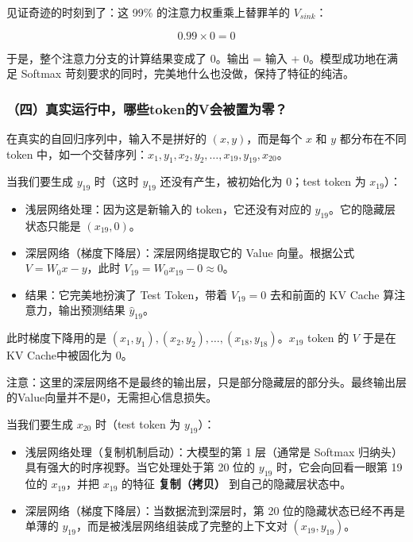 见证奇迹的时刻到了：这 99\% 的注意力权重乘上替罪羊的 \(V_{sink}\)：

\[
0.99 \times 0 = 0
\]

于是，整个注意力分支的计算结果变成了 0。输出 = 输入 + 0。模型成功地在满足 Softmax 苛刻要求的同时，完美地什么也没做，保持了特征的纯洁。

\hypertarget{ux56dbux771fux5b9eux8fd0ux884cux4e2dux54eaux4e9btokenux7684vux4f1aux88abux7f6eux4e3aux96f6}{%
\subsubsection{（四）真实运行中，哪些token的V会被置为零？}\label{ux56dbux771fux5b9eux8fd0ux884cux4e2dux54eaux4e9btokenux7684vux4f1aux88abux7f6eux4e3aux96f6}}

在真实的自回归序列中，输入不是拼好的 \((x,y)\)，而是每个 \(x\) 和 \(y\) 都分布在不同 token 中，如一个交替序列：\(x_1,y_1,x_2,y_2,\ldots,x_{19},y_{19},x_{20}\)。

当我们要生成 \(y_{19}\) 时（这时 \(y_{19}\) 还没有产生，被初始化为 \(0\)；test token 为 \(x_{19}\)）：

\begin{itemize}
\tightlist
\item
  浅层网络处理：因为这是新输入的 token，它还没有对应的 \(y_{19}\)。它的隐藏层状态只能是 \((x_{19},0)\)。
\item
  深层网络（梯度下降层）：深层网络提取它的 Value 向量。根据公式 \(V = W_0x - y\)，此时 \(V_{19}=W_0x_{19}-0 \approx 0\)。
\item
  结果：它完美地扮演了 Test Token，带着 \(V_{19}=0\) 去和前面的 KV Cache 算注意力，输出预测结果 \(\hat{y}_{19}\)。
\end{itemize}

此时梯度下降用的是 \((x_1,y_1),(x_2,y_2),\ldots,(x_{18},y_{18})\)。\(x_{19}\) token 的 \(V\) 于是在KV Cache中被固化为 \(0\)。

注意：这里的深层网络不是最终的输出层，只是部分隐藏层的部分头。最终输出层的Value向量并不是0，无需担心信息损失。

当我们要生成 \(x_{20}\) 时（test token 为 \(y_{19}\)）：

\begin{itemize}
\tightlist
\item
  浅层网络处理（复制机制启动）：大模型的第 1 层（通常是 Softmax 归纳头）具有强大的时序视野。当它处理处于第 20 位的 \(y_{19}\) 时，它会向回看一眼第 19 位的 \(x_{19}\)，并把 \(x_{19}\) 的特征 \textbf{复制（拷贝）} 到自己的隐藏层状态中。
\item
  深层网络（梯度下降层）：当数据流到深层时，第 20 位的隐藏状态已经不再是单薄的 \(y_{19}\)，而是被浅层网络组装成了完整的上下文对 \((x_{19},y_{19})\)。
\end{itemize}

